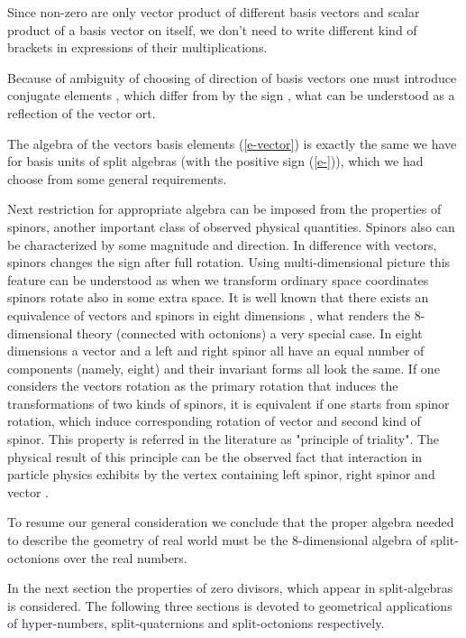 \documentclass[a4paper,12pt]{article}
\begin{document}
Since non-zero are only vector product of different basis vectors and scalar product of 
a basis vector on itself, we don't need to write different kind of brackets in 
expressions of their multiplications. 

Because of ambiguity of choosing of direction of basis vectors one must introduce conjugate 
elements \coordHE{}, which differ from \coordHE{} by the sign \coordHE{}, what can be 
understood as a reflection of the vector ort. 

The algebra of the vectors basis elements (\ref{e-vector}) is exactly the same we have 
for basis units of split algebras (with the positive sign (\ref{e-})), which we had choose 
from some general requirements. 

Next restriction for appropriate algebra can be imposed from the properties of spinors, 
another important class of observed physical quantities. Spinors also can be characterized 
by some magnitude and direction. In difference with vectors, spinors changes the sign after 
full rotation. Using multi-dimensional picture this feature can be understood as when we 
transform ordinary space coordinates spinors rotate also in some extra space. It is well 
known that there exists an equivalence of vectors and spinors in eight dimensions 
\cite{CaGa}, what renders the 8-dimensional theory (connected with octonions) a very 
special case. In eight dimensions a vector and a left and right spinor all have an equal 
number of components (namely, eight) and their invariant forms all look the same. If one 
considers the vectors rotation as the primary rotation that induces the transformations 
of two kinds of spinors, it is equivalent if one starts from spinor rotation, which induce 
corresponding rotation of vector and second kind of spinor. This property is referred in 
the literature as "principle of triality". The physical result of this principle can be 
the observed fact that interaction in particle physics exhibits by the vertex containing 
left spinor, right spinor and vector \cite{Ba}. 

To resume our general consideration we conclude that the proper algebra needed to describe 
the geometry of real world must be the 8-dimensional algebra of split-octonions over the 
real numbers. 

In the next section the properties of zero divisors, which appear in split-algebras is 
considered. The following three sections is devoted to geometrical applications of 
hyper-numbers, split-quaternions and split-octonions respectively.
\end{document}
